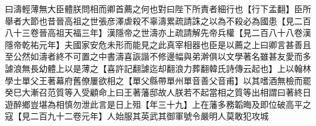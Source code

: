 曰濤輕薄無大臣體朕問相而卿首薦之何也對曰陛下所責者細行也【行下孟翻】臣所舉者大節也昔晉高祖之世張彦澤虐殺不辜濤累疏請誅之以為不殺必為國患【見二百八十三卷晉高祖天福三年】漢隱帝之世濤亦上疏請解先帝兵權【見二百八十八卷漢隱帝乾祐元年】夫國家安危未形而能見之此真宰相器也臣是以薦之上曰卿言甚善且至公然如濤者終不可置之中書濤喜詼諧不修邊幅與弟澣俱以文學著名雖甚友愛而多謔浪無長幼體上以是薄之【喜許記翻謔迄却翻浪力葬翻韓氏詩傳云起也】上以翰林學士單父王著幕府舊僚屢欲相之【單父縣帶單州單音善父音甫】以其嗜酒無檢而罷癸巳大漸召范質等入受顧命上曰王著藩邸故人朕若不起當相之質等出相謂曰著終日遊醉鄉豈堪為相慎勿泄此言是日上殂【年三十九】上在藩多務韜晦及即位破高平之寇【見二百九十二卷元年】人始服其英武其御軍號令嚴明人莫敢犯攻城